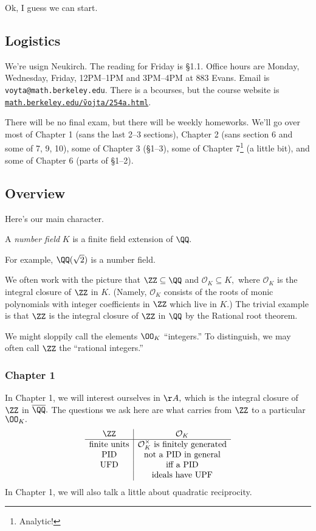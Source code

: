 \documentclass[../notes.tex]{subfiles}
\begin{document}
Ok, I guess we can start.

\subsection{Logistics}
We're usign Neukirch. The reading for Friday is \S1.1. Office hours are Monday, Wednesday, Friday, 12PM--1PM and 3PM--4PM at 883 Evans. Email is \texttt{voyta@math.berkeley.edu}. There is a bcourses, but the course website is \href{https://math.berkeley.edu/~vojta/254a.html}{\texttt{math.berkeley.edu/\~vojta/254a.html}}.

There will be no final exam, but there will be weekly homeworks. We'll go over most of Chapter 1 (sans the last 2--3 sections), Chapter 2 (sans section 6 and some of 7, 9, 10), some of Chapter 3 (\S1--3), some of Chapter 7\footnote{Analytic!} (a little bit), and some of Chapter 6 (parts of \S1--2).

\subsection{Overview}
Here's our main character.
\begin{defi}
    A \textit{number field} $K$ is a finite field extension of $\QQ.$
\end{defi}
\begin{ex}
    For example, $\QQ(\sqrt2)$ is a number field.
\end{ex}
We often work with the picture that $\ZZ\subseteq\QQ$ and $\mathcal O_K\subseteq K,$ where $\mathcal O_K$ is the integral closure of $\ZZ$ in $K.$ (Namely, $\mathcal O_K$ consists of the roots of monic polynomials with integer coefficients in $\ZZ$ which live in $K.$) The trivial example is that $\ZZ$ is the integral closure of $\ZZ$ in $\QQ$ by the Rational root theorem.
\begin{warn}
    We might sloppily call the elements $\OO_K$ ``integers.'' To distinguish, we may often call $\ZZ$ the ``rational integers.''
\end{warn}

\subsubsection{Chapter 1}
In Chapter 1, we will interest ourselves in $\AA,$ which is the integral closure of $\ZZ$ in $\overline\QQ.$ The questions we ask here are what carries from $\ZZ$ to a particular $\OO_K.$
\[\begin{array}{c|c}
    \ZZ & \mathcal O_K \\\hline
    \text{finite units} & \mathcal O_K^\times\text{ is finitely generated} \\
    \text{PID} & \text{not a PID in general} \\
    \text{UFD} & \text{iff a PID} \\
    & \text{ideals have UPF}
\end{array}\]
In Chapter 1, we will also talk a little about quadratic reciprocity.
\end{document}
